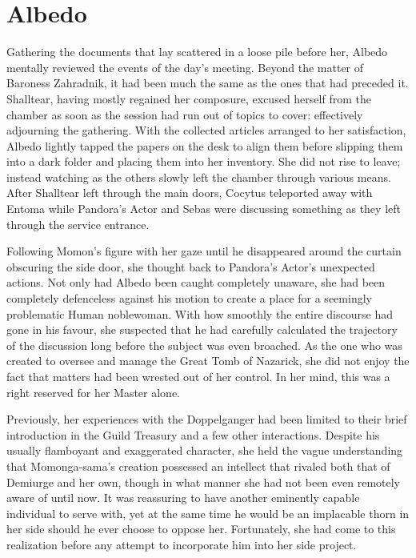 \chapter{Albedo}

Gathering the documents that lay scattered in a loose pile before her, Albedo mentally reviewed the events of the day’s meeting. Beyond the matter of Baroness Zahradnik, it had been much the same as the ones that had preceded it. Shalltear, having mostly regained her composure, excused herself from the chamber as soon as the session had run out of topics to cover: effectively adjourning the gathering. With the collected articles arranged to her satisfaction, Albedo lightly tapped the papers on the desk to align them before slipping them into a dark folder and placing them into her inventory. She did not rise to leave; instead watching as the others slowly left the chamber through various means. After Shalltear left through the main doors, Cocytus teleported away with Entoma while Pandora’s Actor and Sebas were discussing something as they left through the service entrance.

 

Following Momon’s figure with her gaze until he disappeared around the curtain obscuring the side door, she thought back to Pandora’s Actor’s unexpected actions. Not only had Albedo been caught completely unaware, she had been completely defenceless against his motion to create a place for a seemingly problematic Human noblewoman. With how smoothly the entire discourse had gone in his favour, she suspected that he had carefully calculated the trajectory of the discussion long before the subject was even broached. As the one who was created to oversee and manage the Great Tomb of Nazarick, she did not enjoy the fact that matters had been wrested out of her control. In her mind, this was a right reserved for her Master alone.

 

Previously, her experiences with the Doppelganger had been limited to their brief introduction in the Guild Treasury and a few other interactions. Despite his usually flamboyant and exaggerated character, she held the vague understanding that Momonga-sama’s creation possessed an intellect that rivaled both that of Demiurge and her own, though in what manner she had not been even remotely aware of until now. It was reassuring to have another eminently capable individual to serve with, yet at the same time he would be an implacable thorn in her side should he ever choose to oppose her. Fortunately, she had come to this realization before any attempt to incorporate him into her side project.

